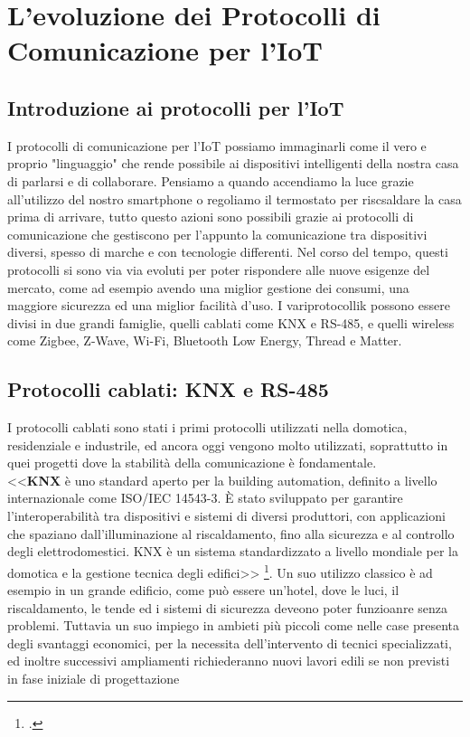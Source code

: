 \chapter{L'evoluzione dei Protocolli di Comunicazione per l'IoT}

\section{Introduzione ai protocolli per l'IoT}
I protocolli di comunicazione per l'IoT possiamo immaginarli come il vero e proprio "linguaggio" che rende possibile ai dispositivi intelligenti della nostra casa di parlarsi e di collaborare. Pensiamo a quando accendiamo la luce grazie all'utilizzo del nostro smartphone o  regoliamo il termostato per riscsaldare la casa prima di arrivare, tutto questo azioni sono possibili grazie ai protocolli di comunicazione che gestiscono per l'appunto la comunicazione tra dispositivi diversi, spesso di marche e con tecnologie differenti. 
Nel corso del tempo, questi protocolli si sono via via evoluti per poter rispondere alle nuove esigenze del mercato, come ad esempio avendo una miglior gestione dei consumi, una maggiore sicurezza ed una miglior facilità d’uso. 
I variprotocollik possono essere divisi in due grandi famiglie, quelli cablati come KNX e RS-485, e quelli wireless come Zigbee, Z-Wave, Wi-Fi, Bluetooth Low Energy, Thread e Matter.

\section{Protocolli cablati: KNX e RS-485}
I protocolli cablati sono stati i primi protocolli utilizzati nella domotica, residenziale e industrile,  ed ancora oggi vengono molto utilizzati, soprattutto in quei progetti dove la stabilità della comunicazione è fondamentale.\\

<<\textbf{KNX} è uno standard aperto per la building automation, definito a livello internazionale come ISO/IEC 14543-3. È stato sviluppato per garantire l’interoperabilità tra dispositivi e sistemi di diversi produttori, con applicazioni che spaziano dall’illuminazione al riscaldamento, fino alla sicurezza e al controllo degli elettrodomestici. KNX è un sistema standardizzato a livello mondiale per la domotica e la gestione tecnica degli edifici>> \footcite{wikipedia_knx}. 
Un suo utilizzo classico è ad esempio in un grande edificio, come può essere un'hotel, dove le luci, il riscaldamento, le tende ed i sistemi di sicurezza deveono poter funzioanre senza problemi. Tuttavia un suo impiego in ambieti più piccoli come nelle case presenta degli svantaggi economici, per la necessita dell'intervento di tecnici specializzati, ed inoltre successivi ampliamenti richiederanno nuovi lavori edili se non previsti in fase iniziale di progettazione\\


